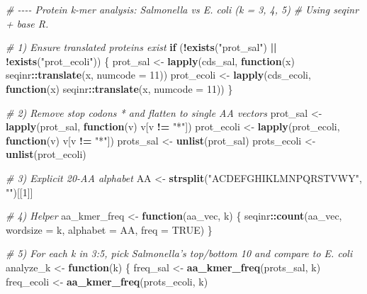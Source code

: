 \documentclass[
]{article}
\newenvironment{Shaded}{\begin{snugshade}}{\end{snugshade}}
\newcommand{\AttributeTok}[1]{\textcolor[rgb]{0.13,0.29,0.53}{#1}}
\newcommand{\CommentTok}[1]{\textcolor[rgb]{0.56,0.35,0.01}{\textit{#1}}}
\newcommand{\ConstantTok}[1]{\textcolor[rgb]{0.56,0.35,0.01}{#1}}
\newcommand{\ControlFlowTok}[1]{\textcolor[rgb]{0.13,0.29,0.53}{\textbf{#1}}}
\newcommand{\DecValTok}[1]{\textcolor[rgb]{0.00,0.00,0.81}{#1}}
\newcommand{\FunctionTok}[1]{\textcolor[rgb]{0.13,0.29,0.53}{\textbf{#1}}}
\newcommand{\NormalTok}[1]{#1}
\newcommand{\OtherTok}[1]{\textcolor[rgb]{0.56,0.35,0.01}{#1}}
\newcommand{\SpecialCharTok}[1]{\textcolor[rgb]{0.81,0.36,0.00}{\textbf{#1}}}
\newcommand{\StringTok}[1]{\textcolor[rgb]{0.31,0.60,0.02}{#1}}
\begin{document}
\begin{Shaded}
\begin{Highlighting}[]
\CommentTok{\# {-}{-}{-}{-} Protein k{-}mer analysis: Salmonella vs E. coli (k = 3, 4, 5) }
\CommentTok{\# Using seqinr + base R.}

\CommentTok{\# 1) Ensure translated proteins exist}
\ControlFlowTok{if}\NormalTok{ (}\SpecialCharTok{!}\FunctionTok{exists}\NormalTok{(}\StringTok{"prot\_sal"}\NormalTok{) }\SpecialCharTok{||} \SpecialCharTok{!}\FunctionTok{exists}\NormalTok{(}\StringTok{"prot\_ecoli"}\NormalTok{)) \{}
\NormalTok{  prot\_sal   }\OtherTok{\textless{}{-}} \FunctionTok{lapply}\NormalTok{(cds\_sal,   }\ControlFlowTok{function}\NormalTok{(x) seqinr}\SpecialCharTok{::}\FunctionTok{translate}\NormalTok{(x, }\AttributeTok{numcode =} \DecValTok{11}\NormalTok{))}
\NormalTok{  prot\_ecoli }\OtherTok{\textless{}{-}} \FunctionTok{lapply}\NormalTok{(cds\_ecoli, }\ControlFlowTok{function}\NormalTok{(x) seqinr}\SpecialCharTok{::}\FunctionTok{translate}\NormalTok{(x, }\AttributeTok{numcode =} \DecValTok{11}\NormalTok{))}
\NormalTok{\}}

\CommentTok{\# 2) Remove stop codons \textquotesingle{}*\textquotesingle{} and flatten to single AA vectors}
\NormalTok{prot\_sal   }\OtherTok{\textless{}{-}} \FunctionTok{lapply}\NormalTok{(prot\_sal,   }\ControlFlowTok{function}\NormalTok{(v) v[v }\SpecialCharTok{!=} \StringTok{"*"}\NormalTok{])}
\NormalTok{prot\_ecoli }\OtherTok{\textless{}{-}} \FunctionTok{lapply}\NormalTok{(prot\_ecoli, }\ControlFlowTok{function}\NormalTok{(v) v[v }\SpecialCharTok{!=} \StringTok{"*"}\NormalTok{])}
\NormalTok{prots\_sal   }\OtherTok{\textless{}{-}} \FunctionTok{unlist}\NormalTok{(prot\_sal)}
\NormalTok{prots\_ecoli }\OtherTok{\textless{}{-}} \FunctionTok{unlist}\NormalTok{(prot\_ecoli)}

\CommentTok{\# 3) Explicit 20{-}AA alphabet }
\NormalTok{AA }\OtherTok{\textless{}{-}} \FunctionTok{strsplit}\NormalTok{(}\StringTok{"ACDEFGHIKLMNPQRSTVWY"}\NormalTok{, }\StringTok{""}\NormalTok{)[[}\DecValTok{1}\NormalTok{]]}

\CommentTok{\# 4) Helper}
\NormalTok{aa\_kmer\_freq }\OtherTok{\textless{}{-}} \ControlFlowTok{function}\NormalTok{(aa\_vec, k) \{}
\NormalTok{  seqinr}\SpecialCharTok{::}\FunctionTok{count}\NormalTok{(aa\_vec, }\AttributeTok{wordsize =}\NormalTok{ k, }\AttributeTok{alphabet =}\NormalTok{ AA, }\AttributeTok{freq =} \ConstantTok{TRUE}\NormalTok{)}
\NormalTok{\}}

\CommentTok{\# 5) For each k in 3:5, pick Salmonella’s top/bottom 10 and compare to E. coli}
\NormalTok{analyze\_k }\OtherTok{\textless{}{-}} \ControlFlowTok{function}\NormalTok{(k) \{}
\NormalTok{  freq\_sal   }\OtherTok{\textless{}{-}} \FunctionTok{aa\_kmer\_freq}\NormalTok{(prots\_sal,   k)}
\NormalTok{  freq\_ecoli }\OtherTok{\textless{}{-}} \FunctionTok{aa\_kmer\_freq}\NormalTok{(prots\_ecoli, k)}


\end{Highlighting}
\end{Shaded}
\end{document}

